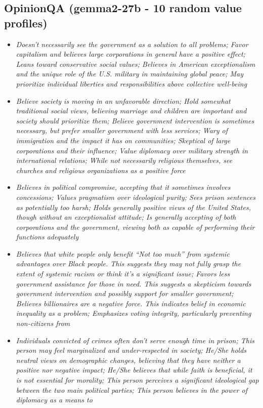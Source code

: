 \documentclass[11pt]{article}
\newcommand{\profiletext}[1]{\textit{#1}}
\begin{document}
\subsection{OpinionQA (gemma2-27b - 10 random value profiles)}
\begin{itemize}
\item \profiletext{Doesn't necessarily see the government as a solution to all problems; Favor capitalism and believes large corporations in general have a positive effect; Leans toward conservative social values; Believes in American exceptionalism and the unique role of the U.S. military in maintaining global peace; May prioritize individual liberties and responsibilities above collective well-being}
\item \profiletext{Believe society is moving in an unfavorable direction; Hold somewhat traditional social views, believing marriage and children are important and society should prioritize them; Believe government intervention is sometimes necessary, but prefer smaller government with less services; Wary of immigration and the impact it has on communities; Skeptical of large corporations and their influence; Value diplomacy over military strength in international relations; While not necessarily religious themselves, see churches and religious organizations as a positive force}
\item \profiletext{Believes in political compromise, accepting that it sometimes involves concessions; Values pragmatism over ideological purity; Sees prison sentences as potentially too harsh; Holds generally positive views of the United States, though without an exceptionalist attitude; Is generally accepting of both corporations and the government, viewing both as capable of performing their functions adequately}
\item \profiletext{Believes that white people only benefit “Not too much” from systemic advantages over Black people. This suggests they may not fully grasp the extent of systemic racism or think it’s a significant issue; Favors less government assistance for those in need. This suggests a skepticism towards government intervention and possibly support for smaller government; Believes billionaires are a negative force.  This indicates belief in economic inequality as a problem; Emphasizes voting integrity, particularly preventing non-citizens from}
\item \profiletext{Individuals convicted of crimes often don't serve enough time in prison; This person may feel marginalized and under-respected in society; He/She holds neutral views on demographic changes, believing that they have neither a positive nor negative impact; He/She believes that while faith is beneficial, it is not essential for morality; This person perceives a significant ideological gap between the two main political parties; This person believes in the power of diplomacy as a means to}

\end{itemize}
\end{document}
